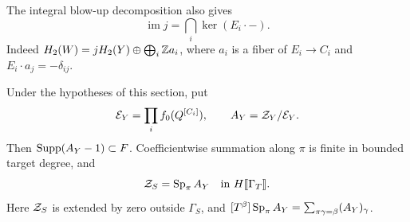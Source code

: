 The integral blow-up decomposition also gives
\begin{equation}\label{eq:zero-contact}
 \operatorname{im}j=\bigcap_i\ker(E_i\cdot-).
\end{equation}
Indeed $H_2(W)=jH_2(Y)\oplus\bigoplus_i\mathbb Z a_i$, where $a_i$ is a
fiber of $E_i\to C_i$ and $E_i\cdot a_j=-\delta_{ij}$.

\begin{theorem}\label{thm:specialization}
Under the hypotheses of this section, put
\[
 \mathcal E_Y=\prod_i f_0(Q^{[C_i]}),\qquad A_Y=\mathcal Z_Y/\mathcal E_Y.
\]
Then $\operatorname{Supp}(A_Y-1)\subset F$. Coefficientwise summation along $\pi$
is finite in bounded target degree, and
\begin{equation}\label{eq:specialization}
 \mathcal Z_S=\operatorname{Sp}_\pi A_Y
   \quad\text{in }H\llbracket\Gamma_T\rrbracket.
\end{equation}
Here $\mathcal Z_S$ is extended by zero outside $\Gamma_S$, and
$[T^\beta]\operatorname{Sp}_\pi A_Y=\sum_{\pi\gamma=\beta}(A_Y)_\gamma$.
\end{theorem}


